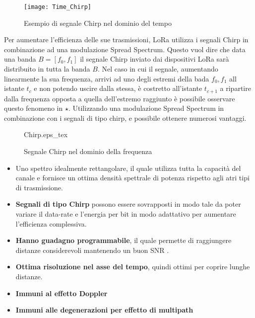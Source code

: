 \begin{figure}[h]
        \centering
                \texttt{[image: Time\_Chirp]}
        \caption{Esempio di segnale Chirp nel dominio del tempo}
\end{figure}
Per aumentare l'efficienza delle sue trasmissioni, LoRa utilizza i segnali Chirp in combinazione ad una
modulazione Spread Spectrum. Questo vuol dire che data una banda $B = [f_0,f_1]$
il segnale Chirp inviato dai dispositivi LoRa sarà distribuito in tutta la banda
$B$. Nel caso in cui il segnale,  aumentando linearmente la sua frequenza, arrivi
ad uno degli estremi della bada $f_0,f_1$  all istante $t_c$ e non potendo uscire 
dalla stessa, è costretto all'istante $t_{c+1}$ a ripartire dalla frequenza opposta a quella
dell'estremo raggiunto è possibile osservare questo fenomeno in
\hyperlink{label_in_fig_1}{$\star$}.
Utilizzando una modulazione Spread Spectrum in combinazione con i segnali di tipo
chirp, e possibile ottenere numerosi vantaggi.
\begin{figure}[h]
        \centering
                {Chirp.eps_tex}
        \caption{Segnale Chirp nel dominio della frequenza}
\end{figure}
\begin{itemize}
\item Uno spettro idealmente rettangolare, il quale utilizza tutta la capacità
del canale e fornisce un ottima densità spettrale di potenza rispetto agli atri
tipi di trasmissione.
\item \textbf{Segnali di tipo Chirp} possono essere sovrapposti in modo tale da
poter variare il data-rate e l'energia per bit in modo adattativo per aumentare
l'efficienza complessiva.
\item \textbf{Hanno guadagno programmabile}, il quale permette di raggiungere
distanze considerevoli mantenendo un buon SNR .
\item  \textbf{Ottima risoluzione nel asse del tempo}, quindi ottimi per coprire
lunghe distanze.
\item \textbf{Immuni al effetto Doppler} 
\item \textbf{Immuni alle degenerazioni per effetto di multipath} 
\end{itemize}

